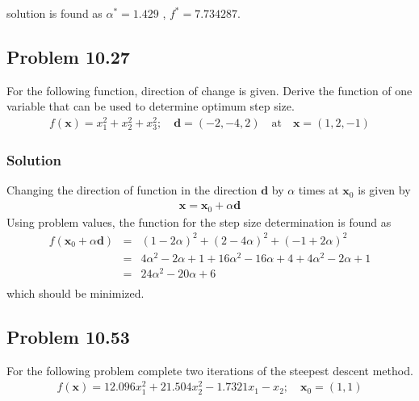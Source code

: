 \documentclass[]{report}
\begin{document}
solution is found as $\alpha^*=1.429$ , $  f^*=7.734287$.
\subsection*{Problem 10.27}
For the following function, direction of change is given. Derive the function of one variable that can be used to determine optimum step size.
\begin{eqnarray*}
f\left(\mathbf x\right)=x_1^2+x_2^2+x_3^2 ; \quad \mathbf d=\left(-2,-4,2\right)\quad \mathrm{at} \quad \mathbf{x}=\left(1,2,-1\right)
\end{eqnarray*}
\subsubsection*{Solution}
Changing the direction of function in the direction $\mathbf d$ by $\alpha$ times at $\mathbf{x}_0$ is given by
\begin{eqnarray*}
\mathbf x=\mathbf{x}_0+\alpha \mathbf d
\end{eqnarray*}
Using problem values, the function for the step size determination is found as
\begin{eqnarray*}
f\left( \mathbf{x}_0+\alpha \mathbf d\right)&=&\left(1-2\alpha\right)^2+\left(2-4\alpha\right)^2+\left(-1+2\alpha\right)^2\\
&=& 4\alpha^2-2\alpha+1+16\alpha^2-16\alpha+4+4\alpha^2-2\alpha+1\\
&=& 24\alpha^2-20\alpha+6\\
\end{eqnarray*}
which should be minimized.
\newpage
\subsection*{Problem 10.53}
\label{Problem1053}
For the following problem complete two iterations of the steepest descent method.
\begin{eqnarray*}
f\left(\mathbf{x}\right)=12.096x_1^2+21.504x_2^2-1.7321x_1-x_2 ; \quad \mathbf x_0 =\left(1,1\right)
\end{eqnarray*}
\end{document}
